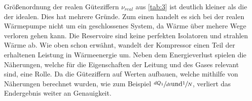 \justifying Größenordnung der realen Güteziffern $\nu_{real}$ aus \ref{tab:3} ist deutlich kleiner als die der idealen. 
Dies hat mehrere Gründe. Zum einen handelt es sich bei der realen Wärmepumpe nicht um ein geschlossenes System, da Wärme über mehere Wege 
verloren gehen kann. Die Reservoire sind keine perfekten Isolatoren und strahlen Wärme ab. Wie oben schon erwähnt, wandelt der Kompressor einen
Teil der erhaltenen Leistung in Wärmeenergie um.
Neben dem Energieverlust spielen die Näherungen, welche für die Eigenschaften der Leitung und des Gases relevant sind, eine Rolle. Da die Güteziffern
auf Werten aufbauen, welche mithilfe von Näherungen berechnet wurden, wie zum Beispiel $\sfrac{dQ_1}{dt} \text{und} \sfrac{1}{N}$, verliert das 
Endergebnis weiter an Genauigkeit. 


\newpage
\printbibliography


